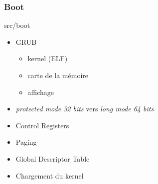 \documentclass[10pt,a4paper]{beamer}
\begin{document}
\begin{frame}
	\frametitle{Boot}
	\textrm{src/boot}

	\begin{itemize}
		\item GRUB
			\begin{itemize}
				\item kernel (ELF)
				\item carte de la mémoire
				\item affichage
			\end{itemize}
		\item \textit{protected mode 32 bits} vers \textit{long mode 64 bits}
		\item Control Registers
		\item Paging
		\item Global Descriptor Table
		\item Chargement du kernel
	\end{itemize}
\end{frame}
\end{document}
